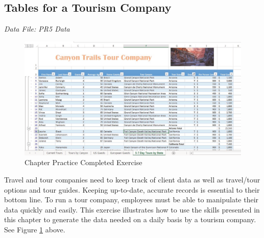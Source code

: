 \subsection{Tables for a Tourism Company}

\textit{Data File: PR5 Data}

\begin{figure}[H]
	\centering
	\includegraphics[width=\maxwidth{.95\linewidth}]{gfx/ch05_fig30}
	\caption{Chapter Practice Completed Exercise}
	\label{05:fig30}
\end{figure}

Travel and tour companies need to keep track of client data as well as travel/tour options and tour guides. Keeping up-to-date, accurate records is essential to their bottom line. To run a tour company, employees must be able to manipulate their data quickly and easily. This exercise illustrates how to use the skills presented in this chapter to generate the data needed on a daily basis by a tourism company. See Figure \ref{05:fig30} above.

